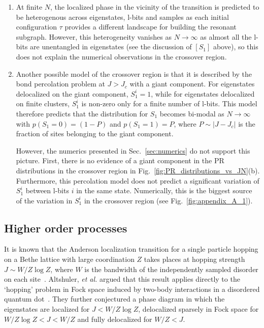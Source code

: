 \documentclass[aps,pra,twocolumn,a4paper,showpacs,superscriptaddress,floatfix,10pt]{revtex4}
\begin{document}
\begin{enumerate}
\item
At finite $N$, the localized phase in the vicinity of the transition is predicted to be heterogenous across eigenstates, l-bits and samples as each initial configuration $\tau$ provides a different landscape for building the resonant subgraph.
However, this heterogeneity vanishes as $N \to \infty$ as almost all the l-bits are unentangled in eigenstates (see the discussion of $[S_1]$ above), so this does not explain the numerical observations in the crossover region.

\item
Another possible model of the crossover region is that it is described by the bond percolation problem at $J>J_c$ with a giant component.
For eigenstates delocalized on the giant component, $S_1^i=1$, while for eigenstates delocalized on finite clusters, $S_1^i$ is non-zero only for a finite number of l-bits.
This model therefore predicts that the distribution for $S_1$ becomes bi-modal as $N \to \infty$ with $p(S_1=0) = (1-P)$ and $p(S_1=1)=P$, where $P \sim |J-J_c|$ is the fraction of sites belonging to the giant component.

However, the numerics presented in Sec.~\ref{sec:numerics} do not support this picture.
First, there is no evidence of a giant component in the PR distributions in the crossover region in Fig.~\ref{fig:PR_distributions_vs_JN}(b).
Furthermore, this percolation model does not predict a significant variation of $S_1^i$ between l-bits $i$ in the same state.
Numerically, this is the biggest source of the variation in $S_1^i$ in the crossover region (see Fig.~\ref{fig:appendix_A_1}).

\end{enumerate}

\subsection{Higher order processes}
\label{sec:pt_higher_order}

It is known that the Anderson localization transition for a single particle hopping on a Bethe lattice with large coordination $Z$ takes places at hopping strength $J \sim W/Z\log Z$, where $W$ is the bandwidth of the independently sampled disorder on each site~\cite{Abou-Chacra:1973qf}.
Altshuler, {\it et al.} argued that this result applies directly to the `hopping' problem in Fock space induced by two-body interactions in a disordered quantum dot~\cite{Altshuler:1997aa}.
They further conjectured a phase diagram in which the eigenstates are localized for $J < W/Z \log Z$, delocalized sparsely in Fock space for $W/Z\log Z < J < W/Z$ and fully delocalized for $W/Z < J$.
\end{document}
